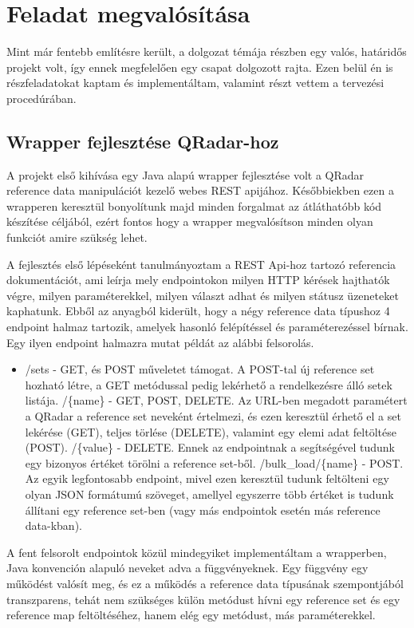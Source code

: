 \chapter{Feladat megvalósítása}
\label{ch:imp}
Mint már fentebb említésre került, a dolgozat témája részben egy valós, határidős projekt volt, így ennek megfelelően egy csapat dolgozott rajta. Ezen belül én is részfeladatokat kaptam és implementáltam, valamint részt vettem a tervezési procedúrában. 

\section{Wrapper fejlesztése QRadar-hoz}
A projekt első kihívása egy Java alapú wrapper fejlesztése volt a QRadar reference data manipulációt kezelő webes REST apijához. Későbbiekben ezen a wrapperen keresztül bonyolítunk majd minden forgalmat az átláthatóbb kód készítése céljából, ezért fontos hogy a wrapper megvalósítson minden olyan funkciót amire szükség lehet.

A fejlesztés első lépéseként tanulmányoztam a REST Api-hoz tartozó referencia dokumentációt, ami leírja mely endpointokon milyen HTTP kérések hajthatók végre, milyen paraméterekkel, milyen választ adhat és milyen státusz üzeneteket kaphatunk. Ebből az anyagból kiderült, hogy a négy reference data típushoz 4 endpoint halmaz tartozik, amelyek hasonló felépítéssel és paraméterezéssel bírnak. Egy ilyen endpoint halmazra mutat példát az alábbi felsorolás.

\begin{itemize}
	\item /sets - GET, és POST műveletet támogat. A POST-tal új reference set hozható létre, a GET metódussal pedig lekérhető a rendelkezésre álló setek listája.
		\subitem /\{name\} - GET, POST, DELETE. Az URL-ben megadott paramétert a QRadar a reference set neveként értelmezi, és ezen keresztül érhető el a set lekérése (GET), teljes törlése (DELETE), valamint egy elemi adat feltöltése (POST).
			\subsubitem /\{value\} - DELETE. Ennek az endpointnak a segítségével tudunk egy bizonyos értéket törölni a reference set-ből.
		\subitem /bulk\_load/\{name\} - POST. Az egyik legfontosabb endpoint, mivel ezen keresztül tudunk feltölteni egy olyan JSON formátumú szöveget, amellyel egyszerre több értéket is tudunk állítani egy reference set-ben (vagy más endpointok esetén más reference data-kban).
\end{itemize}

A fent felsorolt endpointok közül mindegyiket implementáltam a wrapperben, Java konvención alapuló neveket adva a függvényeknek. Egy függvény egy működést valósít meg, és ez a működés a reference data típusának szempontjából transzparens, tehát nem szükséges külön metódust hívni egy reference set és egy reference map feltöltéséhez, hanem elég egy metódust, más paraméterekkel.

